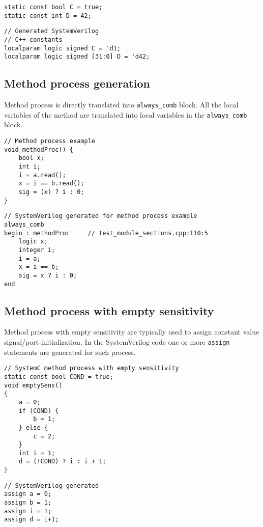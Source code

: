 \begin{lstlisting}[style=mycpp]
static const bool C = true;
static const int D = 42;
\end{lstlisting}
%
\begin{lstlisting}[style=myverilog]
// Generated SystemVerilog
// C++ constants
localparam logic signed C = 'd1;
localparam logic signed [31:0] D = 'd42;
\end{lstlisting}

\subsection{Method process generation}\label{section:method_gen}

Method process is directly translated into {\tt always\_comb} block. All the local variables of the method are translated into local variables in the {\tt always\_comb} block. 

\begin{lstlisting}[style=mycpp]
// Method process example
void methodProc() {
    bool x;
    int i;
    i = a.read();
    x = i == b.read();
    sig = (x) ? i : 0;
}
\end{lstlisting}

\begin{lstlisting}[style=myverilog]
// SystemVerilog generated for method process example
always_comb 
begin : methodProc     // test_module_sections.cpp:110:5
    logic x;
    integer i;
    i = a;
    x = i == b;
    sig = x ? i : 0;
end
\end{lstlisting}

\subsection{Method process with empty sensitivity}\label{section:empty_gen}

Method process with empty sensitivity are typically used to assign constant value signal/port initialization. In the SystemVerilog code one or more {\tt assign} statements are generated for such process. 

\begin{lstlisting}[style=mycpp]
// SystemC method process with empty sensitivity
static const bool COND = true;
void emptySens()
{
    a = 0;
    if (COND) {
        b = 1;
    } else {
        c = 2;
    }
    int i = 1;
    d = (!COND) ? i : i + 1; 
}
\end{lstlisting}
%
\begin{lstlisting}[style=myverilog]
// SystemVerilog generated
assign a = 0;
assign b = 1;
assign i = 1;
assign d = i+1;
\end{lstlisting}


